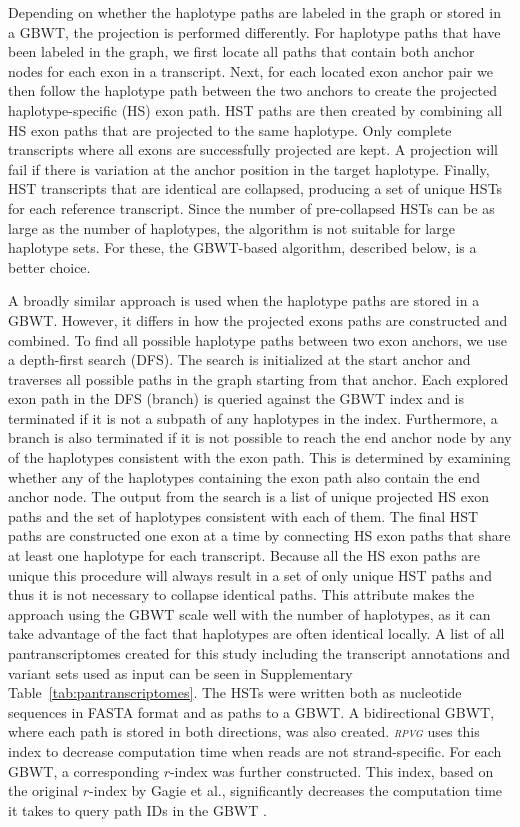 \documentclass[11pt]{ucthesis}
\newcommand{\tool}[1]{\emph{\textsc{#1}}}
\begin{document}
Depending on whether the haplotype paths are labeled in the graph or stored in a GBWT, the projection is performed differently. For haplotype paths that have been labeled in the graph, we first locate all paths that contain both anchor nodes for each exon in a transcript. Next, for each located exon anchor pair we then follow the haplotype path between the two anchors to create the projected haplotype-specific (HS) exon path. HST paths are then created by combining all HS exon paths that are projected to the same haplotype. Only complete transcripts where all exons are successfully projected are kept. A projection will fail if there is variation at the anchor position in the target haplotype. Finally, HST transcripts that are identical are collapsed, producing a set of unique HSTs for each reference transcript. Since the number of pre-collapsed HSTs can be as large as the number of haplotypes, the algorithm is not suitable for large haplotype sets. For these, the GBWT-based algorithm, described below, is a better choice.

A broadly similar approach is used when the haplotype paths are stored in a GBWT. However, it differs in how the projected exons paths are constructed and combined. To find all possible haplotype paths between two exon anchors, we use a depth-first search (DFS). The search is initialized at the start anchor and traverses all possible paths in the graph starting from that anchor. Each explored exon path in the DFS (branch) is queried against the GBWT index and is terminated if it is not a subpath of any haplotypes in the index. Furthermore, a branch is also terminated if it is not possible to reach the end anchor node by any of the haplotypes consistent with the exon path. This is determined by examining whether any of the haplotypes containing the exon path also contain the end anchor node. The output from the search is a list of unique projected HS exon paths and the set of haplotypes consistent with each of them. The final HST paths are constructed one exon at a time by connecting HS exon paths that share at least one haplotype for each transcript. Because all the HS exon paths are unique this procedure will always result in a set of only unique HST paths and thus it is not necessary to collapse identical paths. This attribute makes the approach using the GBWT scale well with the number of haplotypes, as it can take advantage of the fact that haplotypes are often identical locally.
\newline 
\newline
A list of all pantranscriptomes created for this study including the transcript annotations and variant sets used as input can be seen in Supplementary Table~\ref{tab:pantranscriptomes}. The HSTs were written both as nucleotide sequences in FASTA format and as paths to a GBWT. A bidirectional GBWT, where each path is stored in both directions, was also created. \tool{rpvg} uses this index to decrease computation time when reads are not strand-specific. For each GBWT, a corresponding $r$-index was further constructed. This index, based on the original $r$-index by Gagie et al., significantly decreases the computation time it takes to query path IDs in the GBWT \cite{Gagie2020-lq}.
\end{document}
